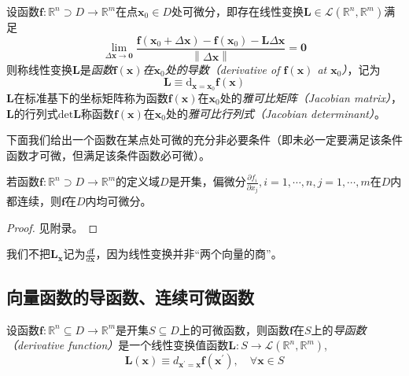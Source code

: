 \documentclass[main.tex]{subfiles}
\begin{document}
\begin{definition}[向量函数的导数]\label{def:II.4.14}
    设函数$\mathbf{f}:\mathbb{R}^n\supset D\rightarrow\mathbb{R}^m$在点$\mathbf{x}_0\in D$处可微分，即存在线性变换$\mathbf{L}\in\mathcal{L}\left(\mathbb{R}^n,\mathbb{R}^m\right)$满足
    \[
        \lim_{\Delta\mathbf{x}\to\mathbf{0}}\frac{\mathbf{f}\left(\mathbf{x}_0+\Delta \mathbf{x}\right)-\mathbf{f}\left(\mathbf{x}_0\right)-\mathbf{L}\Delta\mathbf{x}}{\left\|\Delta\mathbf{x}\right\|}=\mathbf{0}
    \]
    则称线性变换$\mathbf{L}$是\emph{函数$\mathbf{f}\left(\mathbf{x}\right)$在$\mathbf{x}_0$处的导数（derivative of $\mathbf{f}\left(\mathbf{x}\right)$ at $\mathbf{x}_0$）}，记为
    \[\mathbf{L}\equiv \mathrm{d}_{\mathbf{x}=\mathbf{x}_0}\mathbf{f}\left(\mathbf{x}\right)\]
    $\mathbf{L}$在标准基下的坐标矩阵称为函数$\mathbf{f}\left(\mathbf{x}\right)$在$\mathbf{x}_0$处的\emph{雅可比矩阵（Jacobian matrix）}，$\mathbf{L}$的行列式$\mathrm{det}\mathbf{L}$称函数$\mathbf{f}\left(\mathbf{x}\right)$在$\mathbf{x}_0$处的\emph{雅可比行列式（Jacobian determinant）}。
\end{definition}

下面我们给出一个函数在某点处可微的充分非必要条件（即未必一定要满足该条件函数才可微，但满足该条件函数必可微）\cite[“例3”,p.~23]{华工高数2009下}。

\begin{theorem}\label{thm:II.4.9}
    若函数$\mathbf{f}:\mathbb{R}^n\supset D\rightarrow\mathbb{R}^m$的定义域$D$是开集，偏微分$\frac{\partial f_i}{\partial x_j},i=1,\cdots,n,j=1,\cdots,m$在$D$内都连续，则$\mathbf{f}$在$D$内均可微分。
\end{theorem}
\begin{proof}
    见附录。
\end{proof}

我们不把$\mathbf{L}_{\mathbf{x}}$记为$\frac{d\mathbf{f}}{d\mathbf{x}}$，因为线性变换并非“两个向量的商”。

\subsection{向量函数的导函数、连续可微函数}
\begin{definition}[向量函数的导函数]\label{def:II.4.15}
    设函数$\mathbf{f}:\mathbb{R}^n\subseteq D\rightarrow\mathbb{R}^m$是开集$S\subseteq D$上的可微函数，则函数$\mathbf{f}$在$S$上的\emph{导函数（derivative function）}是一个线性变换值函数$\mathbf{L}:S\rightarrow\mathcal{L}\left(\mathbb{R}^n,\mathbb{R}^m\right)$,
    \[\mathbf{L}\left(\mathbf{x}\right)\equiv d_{\mathbf{x}^\prime=\mathbf{x}}\mathbf{f}\left(\mathbf{x}^\prime\right),\quad\forall\mathbf{x}\in S\]
\end{definition}
\end{document}
